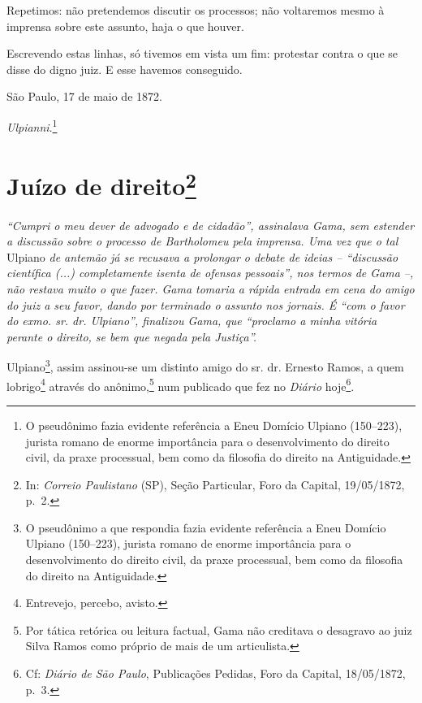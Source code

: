 {Repetimos: não pretendemos discutir os processos; não voltaremos mesmo à
imprensa sobre este assunto, haja o que houver.

Escrevendo estas linhas, só tivemos em vista um fim: protestar contra o
que se disse do digno juiz. E esse havemos conseguido.

São Paulo, 17 de maio de 1872.

\emph{Ulpianni}.\footnote{ O pseudônimo fazia evidente referência a
  Eneu Domício Ulpiano (150--223), jurista romano de enorme importância
  para o desenvolvimento do direito civil, da praxe processual, bem como
  da filosofia do direito na Antiguidade.}

\chapter{Juízo de direito\footnote{ In: \emph{Correio Paulistano} (SP), Seção Particular, Foro
  da Capital, 19/05/1872, p.~2.}} %

\begin{didascalia}
\emph{``Cumpri o meu dever de advogado e de cidadão'', assinalava Gama,
sem estender a discussão sobre o processo de Bartholomeu pela imprensa.
Uma vez que o tal} Ulpiano \emph{de antemão já se recusava a prolongar o
debate de ideias -- ``discussão científica (...) completamente isenta de
ofensas pessoais'', nos termos de Gama --, não restava muito o que fazer.
Gama tomaria a rápida entrada em cena do amigo do juiz a seu favor,
dando por terminado o assunto nos jornais. É ``com o favor do exmo. sr.
dr. Ulpiano'', finalizou Gama, que ``proclamo a minha vitória perante o
direito, se bem que negada pela Justiça''.}
\end{didascalia}

\asterisc{}

Ulpiano\footnote{ O pseudônimo a que respondia fazia evidente
  referência a Eneu Domício Ulpiano (150--223), jurista romano de enorme
  importância para o desenvolvimento do direito civil, da praxe
  processual, bem como da filosofia do direito na Antiguidade.}, assim
assinou-se um distinto amigo do sr. dr. Ernesto Ramos, a quem
lobrigo\footnote{ Entrevejo, percebo, avisto.} através do
anônimo,\footnote{ Por tática retórica ou leitura factual, Gama não
  creditava o desagravo ao juiz Silva Ramos como próprio de mais de um
  articulista.} num publicado que fez no \emph{Diário} hoje\footnote{
  Cf: \emph{Diário de São Paulo}, Publicações Pedidas, Foro da Capital,
  18/05/1872, p.~3.}.

}
